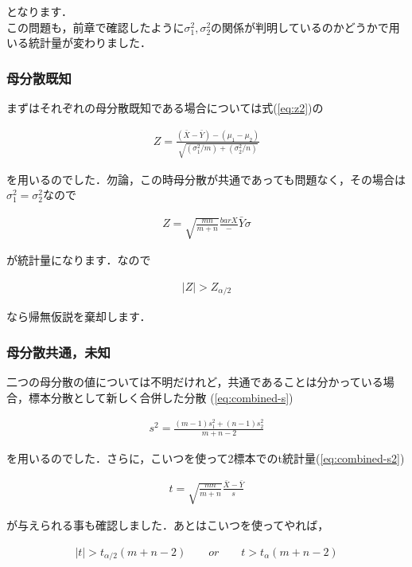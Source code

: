 \documentclass[11pt,a4paper,uplatex]{ujreport} 	%
\begin{document}
となります．\\

この問題も，前章で確認したように$\sigma_1^2, \sigma_2^2$の関係が判明しているのかどうかで用いる統計量が変わりました．

\subsubsection{母分散既知}
まずはそれぞれの母分散既知である場合については式(\ref{eq:z2})の

\begin{align}
  Z = \frac{(\bar{X} - \bar{Y})-(\mu_1-\mu_2)}{\sqrt{(\sigma_1^2/m)+(\sigma_2^2/n)}}
\end{align}

を用いるのでした．勿論，この時母分散が共通であっても問題なく，その場合は$\sigma_1^2=\sigma_2^2$なので

\begin{align}
  Z = \sqrt{\frac{mn}{m+n}} \frac{bar
  X}- \bar{Y}{\sigma}
\end{align}

が統計量になります．なので

\begin{align}
  |Z| >Z_{\alpha/2}
\end{align}

なら帰無仮説を棄却します．

\subsubsection{母分散共通，未知}
二つの母分散の値については不明だけれど，共通であることは分かっている場合，標本分散として新しく合併した分散
(\ref{eq:combined-s})

\begin{align}
  s^2 = \frac{(m-1)s_1^2 + (n-1)s_2^2}{m+n-2}
\end{align}

を用いるのでした．さらに，こいつを使って2標本でのt統計量(\ref{eq:combined-s2})

\begin{align}
  t = \sqrt{\frac{mn}{m+n}} \frac{\bar{X}- \bar{Y}}{s}
\end{align}

が与えられる事も確認しました．あとはこいつを使ってやれば，

\begin{align}
  |t| > t_{\alpha/2}(m+n-2)\qquad or\qquad t>t_\alpha(m+n-2)
\end{align}
\end{document}
